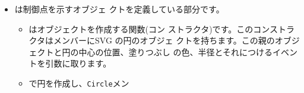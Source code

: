 \begin{itemize}
\begin{itemize}
       では\Bezier 曲線を移動できる範囲の長方形を定
       義しています。
 \item {}では\Bezier 曲線の制御点から定義できる凸
       集合を示すオブジェクトを作成しています。色などの情報は
       で与えています。位置はこのあとのプロ
       グラムで計算して設定します。
 \item 右の部分にある位置を示すテキストボックスなどは
       で作成しています。
\begin{itemize}
 \item {}で要素を作成し、点の名前を表示する
       要素(制御点の色と文字の色を合わせるために
       制御点のデータが入っている配列(\texttt{IPos}を利用している)と
        を作成しています()。
 \item 点の位置を示す2つのテキストボックスはここで定義しているオブジェク
       ト\texttt{BoxP}で実現しています()。オブジェクトか
       ら新規のもの(インスタンス)を作成するためには をそのオブ
       ジェクトの前につけます。
\end{itemize}
 \item 制御点の図形もここで定義しているオブジェクト\texttt{Point}を用いて作成
       しています()。
 \item {}では制御点を順に結んで
       得られる点、また、それらの隣り合う点から得られる新しい点のオブジェ
       クトを作成しています。ここでは位置は設定していません。
 \item 制御点の中間の位置を決める値の\texttt{Portion}の値を\texttt{1/2}
       に設定します()。
 \item 最後に、これらの位置から目的の図形を作成する関数
       \texttt{setControlPointsS}を呼び出して()初期
       化が終了します。
\end{itemize}
 \item {}は制御点を示すオブジェ
       クトを定義している部分です。
\begin{itemize}
 \item {}はオブジェクトを作成する関数(コン
       ストラクタ)です。このコンストラクタはメンバーにSVG の円のオブジェ
       クトを持ちます。この親のオブジェクトと円の中心の位置、塗りつぶし
       の色、半径とそれにつけるイベントを引数に取ります。
 \item {}で円を作成し、\texttt{Circle}メン

\end{itemize}
\end{itemize}
